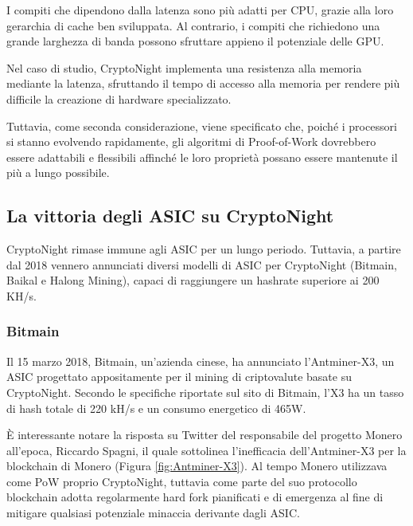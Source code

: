 I compiti che dipendono dalla latenza sono più adatti per CPU, grazie alla loro gerarchia di cache ben sviluppata. 
Al contrario, i compiti che richiedono una grande larghezza di banda possono sfruttare appieno il potenziale delle GPU.

Nel caso di studio, CryptoNight implementa una resistenza alla memoria mediante la latenza, sfruttando il tempo di accesso alla memoria per rendere più difficile la creazione di hardware specializzato.

Tuttavia, come seconda considerazione, viene specificato che, poiché i processori si stanno evolvendo rapidamente, gli algoritmi di Proof-of-Work dovrebbero essere adattabili e flessibili affinché le loro proprietà possano essere mantenute il più a lungo possibile. 



\subsection{La vittoria degli ASIC su CryptoNight}
CryptoNight rimase immune agli ASIC per un lungo periodo. Tuttavia, a partire dal 2018 vennero annunciati diversi modelli di ASIC per CryptoNight (Bitmain, Baikal e Halong Mining), capaci di raggiungere un hashrate superiore ai 200 KH/s.


\subsubsection{Bitmain}
Il 15 marzo 2018, Bitmain, un'azienda cinese, ha annunciato l'Antminer-X3, un ASIC progettato appositamente per il mining di criptovalute basate su CryptoNight. Secondo le specifiche riportate sul sito di Bitmain, l'X3 ha un tasso di hash totale di 220 kH/s e un consumo energetico di 465W.

È interessante notare la risposta su Twitter del responsabile del progetto Monero all'epoca, Riccardo Spagni, il quale sottolinea l'inefficacia dell'Antminer-X3 per la blockchain di Monero (Figura \ref{fig:Antminer-X3}).
Al tempo Monero utilizzava come PoW proprio CryptoNight, tuttavia come parte del suo protocollo blockchain adotta regolarmente hard fork pianificati e di emergenza al fine di mitigare qualsiasi potenziale minaccia derivante dagli ASIC.


